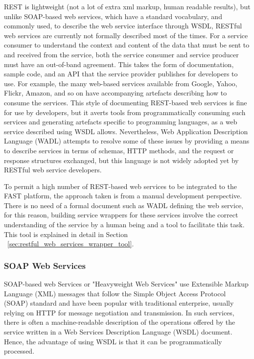 \documentclass{article}
\begin{document}
REST is lightweight (not a lot of extra xml markup, human readable results), but unlike SOAP-based web services, which have a standard vocabulary, and commonly used, to describe the web service interface through WSDL, RESTful web services are currently not formally described most of the times. For a service consumer to understand the context and content of the data that must be sent to and received from the service, both the service consumer and service producer must have an out-of-band agreement. This takes the form of documentation, sample code, and an API that the service provider publishes for developers to use. For example, the many web-based services available from Google, Yahoo, Flickr, Amazon, and so on have accompanying artefacts describing how to consume the services. This style of documenting REST-based web services is fine for use by developers, but it averts tools from programmatically consuming such services and generating artefacts specific to programming languages, as a web service described using WSDL allows. Nevertheless, Web Application Description Language (WADL) attempts to resolve some of these issues by providing a means to describe services in terms of schemas, HTTP methods, and the request or response structures exchanged, but this language is not widely adopted yet by RESTful web service developers.

To permit a high number of REST-based web services to be integrated to the FAST platform, the approach taken is from a manual development perspective. There is no need of a formal document such as WADL defining the web service, for this reason, building service wrappers for these services involve the correct understanding of the service by a human being and a tool to facilitate this task. This tool is explained in detail in Section ~\ref{sec:restful_web_services_wrapper_tool}.


\subsubsection{SOAP Web Services} %
\label{ssub:soap_web_services}

SOAP-based web Services or "Heavyweight Web Services" use Extensible Markup Language (XML) \cite{XML1.1} messages that follow the Simple Object Access Protocol (SOAP) standard \cite{SOAP1.2} and have been popular with traditional enterprise, usually relying on HTTP for message negotiation and transmission. In such services, there is often a machine-readable description of the operations offered by the service written in a Web Services Description Language (WSDL) document. Hence, the advantage of using WSDL is that it can be programmatically processed. 
\end{document}
